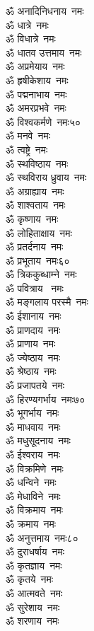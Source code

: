 \begin{multicols}{2}
\begin{flushleft}
ॐ अनादिनिधनाय~नमः\\
ॐ धात्रे~नमः\\
ॐ विधात्रे~नमः\\
ॐ धातव उत्तमाय~नमः\\
ॐ अप्रमेयाय~नमः\\
ॐ हृषीकेशाय~नमः\\
ॐ पद्मनाभाय~नमः\\
ॐ अमरप्रभवे~नमः\\
ॐ विश्वकर्मणे~नमः\hfill ५०\\
ॐ मनवे~नमः\\
ॐ त्वष्ट्रे~नमः\\
ॐ स्थविष्ठाय~नमः\\
ॐ स्थविराय ध्रुवाय~नमः\\
ॐ अग्राह्याय~नमः\\
ॐ शाश्वताय~नमः\\
ॐ कृष्णाय~नमः\\
ॐ लोहिताक्षाय~नमः\\
ॐ प्रतर्दनाय~नमः\\
ॐ प्रभूताय~नमः\hfill ६०\\
ॐ त्रिककुब्धाम्ने~नमः\\
ॐ पवित्राय ~नमः\\
ॐ मङ्गलाय परस्मै~नमः\\
ॐ ईशानाय~नमः\\
ॐ प्राणदाय~नमः\\
ॐ प्राणाय~नमः\\
ॐ ज्येष्ठाय~नमः\\
ॐ श्रेष्ठाय~नमः\\
ॐ प्रजापतये~नमः\\
ॐ हिरण्यगर्भाय~नमः\hfill ७०\\
ॐ भूगर्भाय~नमः\\
ॐ माधवाय~नमः\\
ॐ मधुसूदनाय~नमः\\
ॐ ईश्वराय~नमः\\
ॐ विक्रमिणे~नमः\\
ॐ धन्विने~नमः\\
ॐ मेधाविने~नमः\\
ॐ विक्रमाय~नमः\\
ॐ क्रमाय~नमः\\
ॐ अनुत्तमाय~नमः\hfill ८०\\
ॐ दुराधर्षाय~नमः\\
ॐ कृतज्ञाय~नमः\\
ॐ कृतये~नमः\\
ॐ आत्मवते~नमः\\
ॐ सुरेशाय~नमः\\
ॐ शरणाय~नमः\\

\end{flushleft}
\end{multicols}
